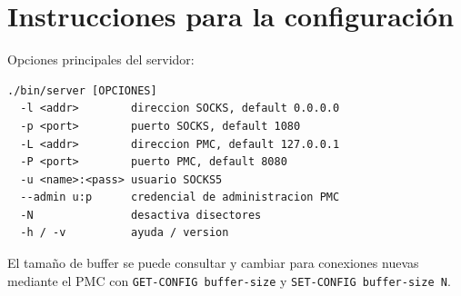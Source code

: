 \section{Instrucciones para la configuración}

Opciones principales del servidor:
\begin{verbatim}
./bin/server [OPCIONES]
  -l <addr>        direccion SOCKS, default 0.0.0.0
  -p <port>        puerto SOCKS, default 1080
  -L <addr>        direccion PMC, default 127.0.0.1
  -P <port>        puerto PMC, default 8080
  -u <name>:<pass> usuario SOCKS5
  --admin u:p      credencial de administracion PMC
  -N               desactiva disectores
  -h / -v          ayuda / version
\end{verbatim}

El tamaño de buffer se puede consultar y cambiar para conexiones nuevas mediante
el PMC con \texttt{GET-CONFIG buffer-size} y \texttt{SET-CONFIG buffer-size N}.
